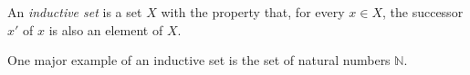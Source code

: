 \documentclass{article}
\begin{document}
An {\em inductive set} is a set $X$ with the property that, for every $x \in X$, the successor $x'$ of $x$ is also an element of $X$.

One major example of an inductive set is the set of natural numbers $\mathbb{N}$.
\end{document}
